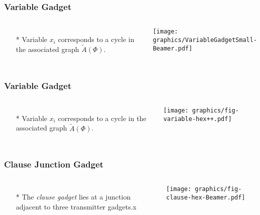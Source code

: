\documentclass{beamer}
\begin{document}
\begin{frame} \frametitle{Variable Gadget}
    \begin{columns}[c]
        \begin{itemize}
            \item[*] Variable $x_i$ corresponds to a cycle in the associated graph $\tilde{A}(\Phi)$. 
        \end{itemize}
                    \begin{minipage}{\linewidth}
            \begin{center}
            \texttt{[image: graphics/VariableGadgetSmall-Beamer.pdf]}
            \end{center}
        \end{minipage}
    \end{columns}
\end{frame}

\begin{frame} \frametitle{Variable Gadget}
    \begin{columns}[c]
        \begin{itemize}
            \item[*] Variable $x_i$ corresponds to a cycle in the associated graph $\tilde{A}(\Phi)$. 
        \end{itemize}
                    \begin{minipage}{\linewidth}
            \begin{center}
            \texttt{[image: graphics/fig-variable-hex++.pdf]}
            \end{center}
        \end{minipage}
    \end{columns}
\end{frame}

\begin{frame} \frametitle{Clause Junction Gadget}
    \begin{columns}[c]
        \begin{itemize}
            \item[*] The {\it clause gadget} lies at a junction adjacent to three transmitter gadgets.x
        \end{itemize}
        \begin{minipage}{\linewidth}
            \begin{center}
            \texttt{[image: graphics/fig-clause-hex-Beamer.pdf]}\label{gfx:fig-clause-hex-Beamer.pdf}
            \end{center}
        \end{minipage}
    \end{columns}
\end{frame}
\end{document}
